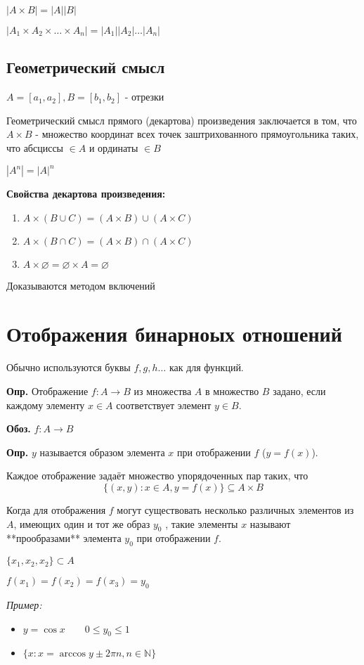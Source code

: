 \documentclass[10pt]{article}
\begin{document}
\par $|A \times B| = |A||B|$
\par $|A_{1} \times A_{2} \times \dots \times A_{n}| = |A_{1}||A_{2}|\dots|A_{n}|$
\subsection*{Геометрический смысл}
\par $A = [a_{1}, a_{2}], B = [b_{1}, b_{2}]$ - отрезки
\par Геометрический смысл прямого (декартова) произведения заключается в том, что $A \times B$ - множество координат всех точек заштрихованного прямоугольника таких, что абсциссы $\in A$ и ординаты $\in B$
\par $|A^n| = |A|^n$
\par\textbf{Свойства декартова произведения:}
\begin{enumerate}
    \item $A \times (B \cup C) = (A \times B) \cup (A \times C)$
    \item $A \times (B \cap C) = (A \times B) \cap (A \times C)$
    \item $A \times \varnothing = \varnothing \times A = \varnothing$
\end{enumerate}
\par Доказываются методом включений

\section*{Отображения бинарноых отношений}
\par Обычно используются буквы $f, g, h\dots$ как для функций.

\par\textbf{Опр.} Отображение $f: A \rightarrow B$ из множества $A$ в множество $B$ задано, если каждому элементу $x \in A$ соответствует элемент $y \in B$.
\par\textbf{Обоз.} $f: A \rightarrow B$

\par\textbf{Опр.} $y$ называется образом элемента $x$ при отображении $f$ ($y = f(x)$).
\par Каждое отображение задаёт множество упорядоченных пар таких, что $$\{ (x, y): x \in A, y = f(x) \} \subseteq A \times B$$
\par Когда для отображения $f$ могут существовать несколько различных элементов из $A$, имеющих один и тот же образ $y_{0}$ , такие элементы $x$ называют **прообразами** элемента $y_{0}$ при отображении $f$.
\par $\{ x_{1}, x_{2}, x_{2} \} \subset A$
\par $f(x_{1}) = f(x_{2}) = f(x_{3}) = y_{0}$
\par\textit{Пример:}
\begin{itemize}
    \item $y = \cos x \qquad 0 \leq y_{0} \leq 1$
    \item $\{ x: x = \arccos{y} \pm 2\pi n, n \in \mathbb{N} \}$
\end{itemize}
\end{document}
